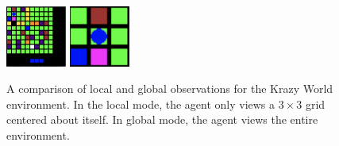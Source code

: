 \documentclass{article} %
\begin{document}
\begin{figure}[H]
\begin{center}
\includegraphics[height=20mm]{envs/grid_0.png} %
\includegraphics[height=20mm]{envs/grid_local.png}  
\end{center}
\caption{A comparison of local and global observations for the Krazy World environment. In the local mode, the agent only views a $3 \times 3$ grid centered about itself. In global mode, the agent views the entire environment.}
\end{figure} 
\end{document}
